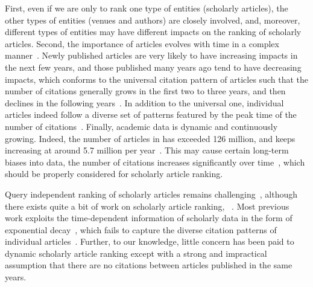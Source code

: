 First, even if we are only to rank one type of entities (\ie scholarly articles), the other types of entities (\eg venues and authors) are closely involved, and, moreover, different types of entities may have different impacts on the ranking of scholarly articles.
%
Second, the importance of articles evolves with time in a complex manner~\cite{WangSB13,Chakraborty15}.
Newly published articles are very likely to have increasing impacts in the next few years, and those published many years ago tend to have decreasing impacts, which conforms to the universal citation pattern of articles such that the number of citations generally grows in the first two to three years, and then declines in the following years~\cite{Chakraborty15}. In addition to the universal one, individual articles indeed follow a diverse set of patterns featured by the peak time of the number of citations~\cite{Chakraborty15}.
Finally, academic data is dynamic and continuously growing. Indeed, the number of articles in \magdata has exceeded 126 million, and keeps increasing at around 5.7 million per year~\cite{Sinha15:MAG}. This may cause certain long-term biases into data, \eg the number of citations increases significantly over time~\cite{BornmannM15}, which should be properly considered for scholarly article ranking.


Query independent ranking of scholarly articles remains challenging~\cite{wsdmcup}, although there exists quite a bit of work on scholarly article ranking, \eg~\cite{Garfield471,Liang16AAAI,Jiang12-MRank,Waltman2014}.
Most previous work exploits the time-dependent information of scholarly data in the form of exponential decay~\cite{Li08TSRanking,Wang13AAAI,sayyadi09,WalkerXKM07}, which fails to capture the diverse citation patterns of individual articles~\cite{Chakraborty15}.
Further, to our knowledge, little concern has been paid to dynamic scholarly article ranking except \cite{GhoshKHLL11} with a strong and impractical assumption that there are no citations between articles published in the same years.




